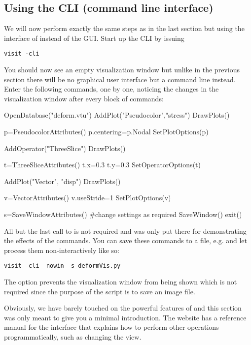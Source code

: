 \subsection{Using the \VisIt CLI (command line interface)}
We will now perform exactly the same steps as in the last section but using the
\PYTHON interface of \VisIt instead of the GUI. Start up the CLI by issuing
\begin{verbatim}
visit -cli
\end{verbatim}
You should now see an empty visualization window but unlike in the previous
section there will be no graphical user interface but a \PYTHON command line
instead.
Enter the following commands, one by one, noticing the changes in the
visualization window after every block of commands:
\begin{python}
  OpenDatabase("deform.vtu")
  AddPlot("Pseudocolor","stress")
  DrawPlots()

  p=PseudocolorAttributes()
  p.centering=p.Nodal
  SetPlotOptions(p)

  AddOperator("ThreeSlice")
  DrawPlots()

  t=ThreeSliceAttributes()
  t.x=0.3
  t.y=0.3
  SetOperatorOptions(t)

  AddPlot("Vector", "disp")
  DrawPlots()

  v=VectorAttributes()
  v.useStride=1
  SetPlotOptions(v)

  s=SaveWindowAttributes()
  #change settings as required
  SaveWindow()
  exit()
\end{python}
All but the last call to  is not required and was only put
there for demonstrating the effects of the commands.
You can save these commands to a file, e.g.  and let \VisIt
process them non-interactively like so:
\begin{verbatim}
visit -cli -nowin -s deformVis.py
\end{verbatim}
The  option prevents the visualization window from being shown
which is not required since the purpose of the script is to save an image file.

Obviously, we have barely touched on the powerful features of \VisIt and this
section was only meant to give you a minimal introduction. The \VisIt website
has a reference manual for the \PYTHON interface that explains how to perform
other operations programmatically, such as changing the view.

